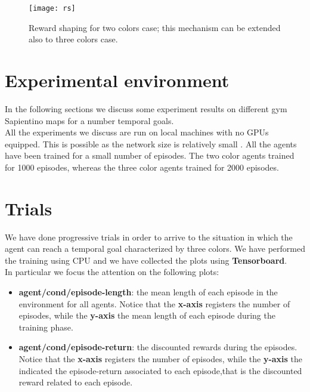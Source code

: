 \documentclass{article}
\begin{document}
\vspace{2em}
\begin{figure}[H]
\centering
\texttt{[image: rs]}
\caption{Reward shaping for two colors case; this mechanism can be extended also to three colors case.}
\label{fig:reward shaping}
\end{figure}




\section{Experimental environment}


In the following sections we discuss some experiment results on different gym Sapientino maps for a number temporal goals. \\
All the experiments we discuss are run on local machines with no GPUs equipped. This is possible as the network size is relatively small  . All the agents have been trained for a small number of episodes. 
The two color agents trained for 1000 episodes, whereas the three color agents trained for 2000 episodes. %



\section{Trials}
We have done progressive trials in order to arrive to the situation in which the agent can reach a temporal goal characterized by three colors.
We have performed the training using CPU and we have collected the plots using \textbf{Tensorboard}.\\
In particular we focus the attention on the following plots:
\begin{itemize}
    \item \textbf{agent/cond/episode-length}: the mean length of each episode in the environment for all agents.
    Notice that the \textbf{x-axis} registers the number of episodes, while the \textbf{y-axis} the mean length of each episode during the training phase.
    \item \textbf{agent/cond/episode-return}: the discounted rewards during the episodes.
    Notice that the \textbf{x-axis} registers the number of episodes, while the \textbf{y-axis} the indicated the episode-return associated to each episode,that is the discounted reward related to each episode.
    
\end{itemize}
\end{document}
